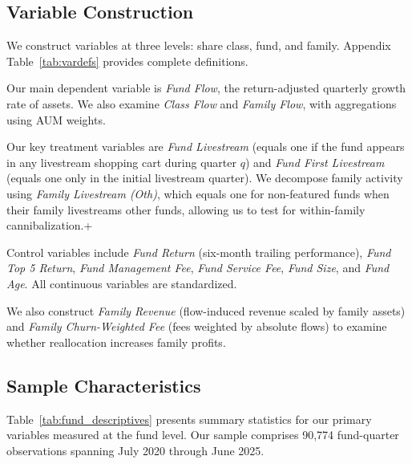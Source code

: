 \documentclass[12pt]{article}
\begin{document}

\subsection{Variable Construction}\label{subsec:variables}

We construct variables at three levels: share class, fund, and family. Appendix Table~\ref{tab:vardefs} provides complete definitions.

Our main dependent variable is \textit{Fund Flow}, the return-adjusted quarterly growth rate of assets. We also examine \textit{Class Flow} and \textit{Family Flow}, with aggregations using AUM weights.

Our key treatment variables are \textit{Fund Livestream} (equals one if the fund appears in any livestream shopping cart during quarter $q$) and \textit{Fund First Livestream} (equals one only in the initial livestream quarter). We decompose family activity using \textit{Family Livestream (Oth)}, which equals one for non-featured funds when their family livestreams other funds, allowing us to test for within-family cannibalization.+

Control variables include \textit{Fund Return} (six-month trailing performance), \textit{Fund Top 5 Return}, \textit{Fund Management Fee}, \textit{Fund Service Fee}, \textit{Fund Size}, and \textit{Fund Age}. All continuous variables are standardized.

We also construct \textit{Family Revenue} (flow-induced revenue scaled by family assets) and \textit{Family Churn-Weighted Fee} (fees weighted by absolute flows) to examine whether reallocation increases family profits.

\subsection{Sample Characteristics}\label{subsec:class_descriptives}

Table~\ref{tab:fund_descriptives} presents summary statistics for our primary variables measured at the fund level. Our sample comprises 90,774 fund-quarter observations spanning July 2020 through June 2025.
\end{document}
